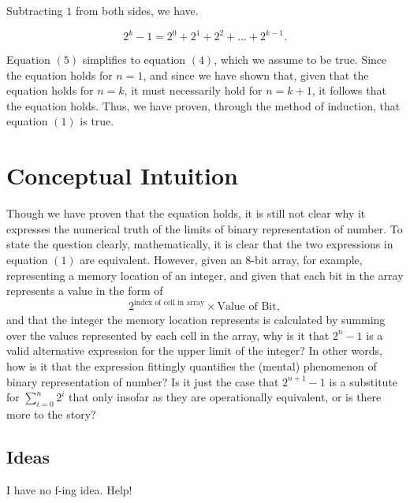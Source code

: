 \documentclass[11pt]{article}
\begin{document}
    \begin{flushleft}
        Subtracting $1$ from both sides, we have.
    \end{flushleft}
    \begin{equation}
        2^{k} - 1 = 2^{0} + 2^{1} + 2^{2} + ... + 2^{k - 1}.
    \end{equation}
    
    \begin{flushleft}
        Equation $(5)$ simplifies to equation $(4)$, which we assume to be true. Since the equation holds for $n = 1$, and since we have shown that, given that the equation holds for $n = k$, it must necessarily hold for $n = k + 1$, it follows that the equation holds. Thus, we have proven, through the method of induction, that equation $(1)$ is true.
    \end{flushleft}
    
 \section{Conceptual Intuition}
 Though we have proven that the equation holds, it is still not clear why it expresses the numerical truth of the limits of binary representation of number. To state the question clearly, mathematically, it is clear that the two expressions in equation $(1)$ are equivalent. However, given an 8-bit array, for example, representing a memory location of an integer, and given that each bit in the array represents a value in the form of 
     \begin{equation*}
         2^{\textrm{index of cell in array}} \times \textrm{Value of Bit},
     \end{equation*}
and that the integer the memory location represents is calculated by summing over the values represented by each cell in the array, why is it that $2^{n} - 1$ is a valid alternative expression for the upper limit of the integer? In other words, how is it that the expression fittingly quantifies the (mental) phenomenon of binary representation of number? Is it just the case that $2^{n + 1} - 1$ is a substitute for $\sum_{i=0}^{n} 2^{i}$ that only insofar as they are operationally equivalent, or is there more to the story?
 
     \subsection{Ideas}
         I have no f-ing idea. Help!
 
 
\end{document}
